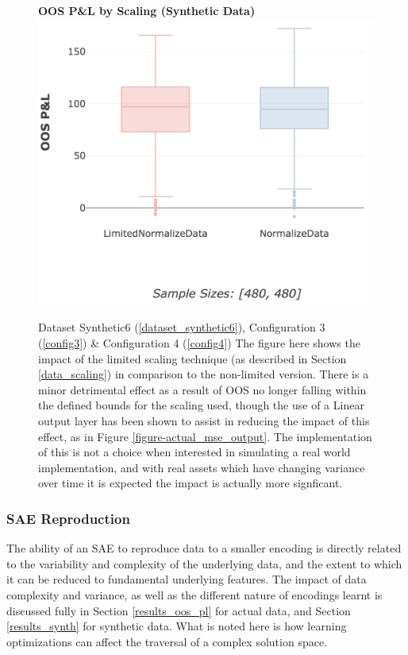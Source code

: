 \documentclass[a4paper,11pt,oneside]{article}
\theoremstyle{plain}
\theoremstyle{definition}
\begin{document}
	\begin{figure}[H]
		\centering
		\textbf{OOS P\&L by Scaling (Synthetic Data)} 
		\includegraphics[scale=0.34]{images/results/complexity/oos_scaling.png}
		\caption[OOS P\&L by Scaling (Synthetic Data)]{Dataset Synthetic6  (\ref{dataset_synthetic6}), Configuration 3 (\ref{config3}) \& Configuration 4 (\ref{config4})
				\newline The figure here shows the impact of the limited scaling technique (as described in Section \ref{data_scaling}) in comparison to the non-limited version. There is a minor detrimental effect as a result of OOS no longer falling within the defined bounds for the scaling used, though the use of a Linear output layer has been shown to assist in reducing the impact of this effect, as in Figure \ref{figure-actual_mse_output}. The implementation of this is not a choice when interested in simulating a real world implementation, and with real assets which have changing variance over time it is expected the impact is actually more signficant. }
		\label{figure-synth_pl_scaling}
	\end{figure}


	
	\subsubsection{SAE Reproduction}

	The ability of an SAE to reproduce data to a smaller encoding is directly related to the variability and complexity of the underlying data, and the extent to which it can be reduced to fundamental underlying features. The impact of data complexity and variance, as well as the different nature of encodings learnt is discussed fully in Section \ref{results_oos_pl} for actual data, and Section \ref{results_synth} for synthetic data. What is noted here is how learning optimizations can affect the traversal of a complex solution space. \newline
	
\end{document}
